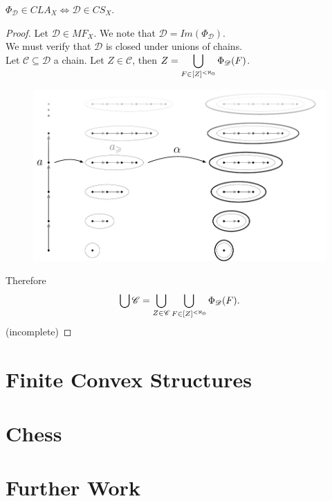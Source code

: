 \documentclass{amsart}
\begin{document}
\begin{theorem}
\(\Phi _{\mathscr{D}} \in CLA_X \iff \mathscr{D} \in CS_X\).
\end{theorem}
\begin{proof}
Let \(\mathscr{D} \in MF_X\).
We note that \(\mathscr{D} = Im(\Phi _{\mathscr{D}})\). \\ 
We must verify that \(\mathscr{D}\) is closed under unions of chains. \\ 
Let \(\mathscr{C} \subseteq \mathscr{D}\) a chain. 
Let \(Z \in \mathscr{C}\), then 
\(Z = \displaystyle\bigcup_{F \in [Z]^ {< \aleph _0}} \Phi _{\mathscr{D}} (F)\). 
\begin{figure}[hbtp!]
	\centering
	\includegraphics[width= 0.6 \linewidth, page = 1]{IMAGES/2/2}
\end{figure}
Therefore
\[
	\displaystyle\bigcup \mathscr{C} =
	\displaystyle\bigcup_{Z \in \mathscr{C}} 
	\displaystyle\bigcup_{F \in [Z]^ {< \aleph _0}} \Phi _{\mathscr{D}} (F).
\]
(incomplete)
\end{proof}

\section{Finite Convex Structures} %

\section{Chess} %

\section{Further Work} %



\end{document}
